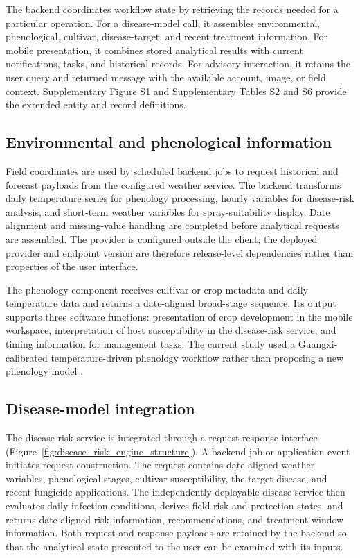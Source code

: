 \documentclass[12pt]{article}
\begin{document}
The backend coordinates workflow state by retrieving the records needed for a particular operation. For a disease-model call, it assembles environmental, phenological, cultivar, disease-target, and recent treatment information. For mobile presentation, it combines stored analytical results with current notifications, tasks, and historical records. For advisory interaction, it retains the user query and returned message with the available account, image, or field context. Supplementary Figure S1 and Supplementary Tables S2 and S6 provide the extended entity and record definitions.

\subsection{Environmental and phenological information}\label{weather-and-phenology-processing}

Field coordinates are used by scheduled backend jobs to request historical and forecast payloads from the configured weather service. The backend transforms daily temperature series for phenology processing, hourly variables for disease-risk analysis, and short-term weather variables for spray-suitability display. Date alignment and missing-value handling are completed before analytical requests are assembled. The provider is configured outside the client; the deployed provider and endpoint version are therefore release-level dependencies rather than properties of the user interface.

The phenology component receives cultivar or crop metadata and daily temperature data and returns a date-aligned broad-stage sequence. Its output supports three software functions: presentation of crop development in the mobile workspace, interpretation of host susceptibility in the disease-risk service, and timing information for management tasks. The current study used a Guangxi-calibrated temperature-driven phenology workflow rather than proposing a new phenology model \citep{parkerGeneralPhenologicalModel2011a,wangAssessingGrapevinePhenological2020}.

\subsection{Disease-model integration}\label{disease-model-integration}

The disease-risk service is integrated through a request-response interface (Figure~\ref{fig:disease_risk_engine_structure}). A backend job or application event initiates request construction. The request contains date-aligned weather variables, phenological stages, cultivar susceptibility, the target disease, and recent fungicide applications. The independently deployable disease service then evaluates daily infection conditions, derives field-risk and protection states, and returns date-aligned risk information, recommendations, and treatment-window information. Both request and response payloads are retained by the backend so that the analytical state presented to the user can be examined with its inputs.
\end{document}
